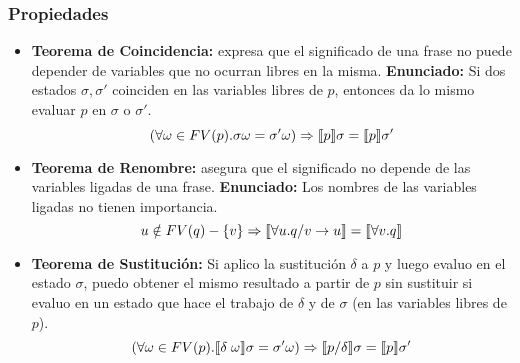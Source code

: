     \subsubsection*{Propiedades}
      \begin{itemize}
        \item \textbf{Teorema de Coincidencia:} expresa que el significado de una frase no puede depender de variables que no ocurran libres en la misma.
          \PN \textbf{Enunciado:} Si dos estados $\sigma, \sigma'$ coinciden en las variables libres de $p$, entonces da lo mismo evaluar $p$ en $\sigma$ o $\sigma'$.
          \[
            (\forall \omega \in FV(p) . \sigma \omega = \sigma' \omega) \Rightarrow \llbracket p\rrbracket \sigma = \llbracket p\rrbracket \sigma'
          \]
        \item \textbf{Teorema de Renombre:} asegura que el significado no depende de las variables ligadas de una frase.
          \PN \textbf{Enunciado:} Los nombres de las variables ligadas no tienen importancia.
          \[
            u \notin FV(q) - \{v\} \Rightarrow \llbracket\forall u . q/v \rightarrow u\rrbracket = \llbracket\forall v . q\rrbracket
          \]
        \item \textbf{Teorema de Sustitución:} Si aplico la sustitución $\delta$ a $p$ y luego evaluo en el estado $\sigma$, puedo obtener el mismo resultado a partir de $p$ sin sustituir si evaluo en un estado que hace el trabajo de $\delta$ y de $\sigma$ (en las variables libres de $p$).
          \[
            (\forall \omega \in FV(p) . \llbracket\delta \; \omega\rrbracket \sigma = \sigma' \omega) \Rightarrow \llbracket p/\delta\rrbracket \sigma = \llbracket p\rrbracket \sigma'
          \]
      \end{itemize}
